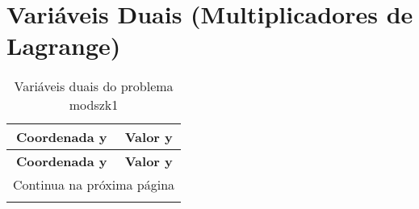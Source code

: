 \documentclass[12pt]{article}
\begin{document}
\section{Variáveis Duais (Multiplicadores de Lagrange)}

\begin{longtable}{@{}cc@{}}
\caption{Variáveis duais do problema modszk1} \\
\toprule
\textbf{Coordenada y} & \textbf{Valor y} \\
\midrule
\endfirsthead

\toprule
\textbf{Coordenada y} & \textbf{Valor y} \\
\midrule
\endhead

\midrule \multicolumn{2}{r}{{Continua na próxima página}} \\ \midrule
\endfoot


\end{longtable}
\end{document}
